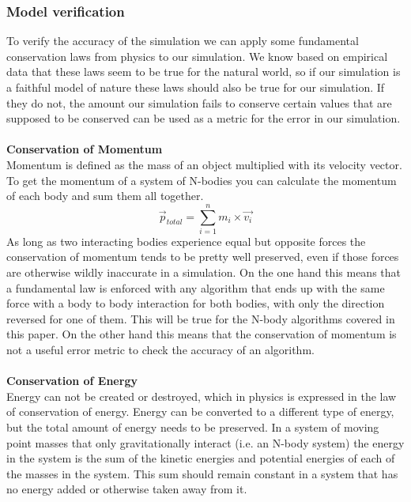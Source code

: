 \documentclass[11pt]{article} %
\begin{document}
\subsubsection{Model verification}
\label{verification}
To verify the accuracy of the simulation we can apply some fundamental conservation laws from physics to our simulation. We know based on empirical data that these laws seem to be true for the natural world, so if our simulation is a faithful model of nature these laws should also be true for our simulation. If they do not, the amount our simulation fails to conserve certain values that are supposed to be conserved can be used as a metric for the error in our simulation.\\\\
\textbf{Conservation of Momentum}\\
Momentum is defined as the mass of an object multiplied with its velocity vector. To get the momentum of a system of N-bodies you can calculate the momentum of each body and sum them all together.
\begin{equation}
    \vec{p}_{total} = \sum_{i=1}^n m_i \times \vec{v_i}
\end{equation}
As long as two interacting bodies experience equal but opposite forces the conservation of momentum tends to be pretty well preserved, even if those forces are otherwise wildly inaccurate in a simulation. On the one hand this means that a fundamental law is enforced with any algorithm that ends up with the same force with a body to body interaction for both bodies, with only the direction reversed for one of them. This will be true for the N-body algorithms covered in this paper. On the other hand this means that the conservation of momentum is not a useful error metric to check the accuracy of an algorithm. \\\\
\textbf{Conservation of Energy}\\
Energy can not be created or destroyed, which in physics is expressed in the law of conservation of energy. Energy can be converted to a different type of energy, but the total amount of energy needs to be preserved. In a system of moving point masses that only gravitationally interact (i.e. an N-body system) the energy in the system is the sum of the kinetic energies and potential energies of each of the masses in the system. This sum should remain constant in a system that has no energy added or otherwise taken away from it. \\\\
\end{document}
